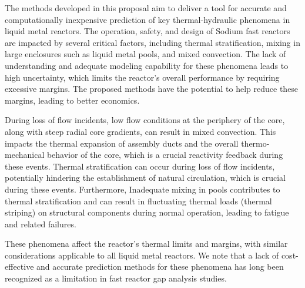 


The methods developed in this proposal aim to deliver a tool for accurate and
computationally inexpensive prediction of key thermal-hydraulic phenomena in
liquid metal reactors. The operation, safety, and design of Sodium fast
reactors are impacted by several critical factors, including thermal
stratification, mixing in large enclosures such as liquid metal pools, and
mixed convection. The lack of understanding and adequate modeling capability
for these phenomena leads to high uncertainty, which limits the reactor's
overall performance by requiring excessive margins. The proposed methods have
the potential to help reduce these margins, leading to better economics. 

During loss of flow incidents, low flow conditions at the periphery of the
core, along with steep radial core gradients, can result in mixed convection.
This impacts the thermal expansion of assembly ducts and the overall
thermo-mechanical behavior of the core, which is a crucial reactivity feedback
during these events.  Thermal stratification can occur during loss of flow
incidents, potentially hindering the establishment of natural circulation,
which is crucial during these events. Furthermore, Inadequate mixing in pools
contributes to thermal stratification and can result in fluctuating thermal
loads (thermal striping) on structural components during normal operation,
leading to fatigue and related failures.

These phenomena affect the reactor's thermal limits and margins, with similar
considerations applicable to all liquid metal reactors. We note that a lack of
cost-effective and accurate prediction methods for these phenomena has long
been recognized as a limitation in fast reactor gap analysis studies.



